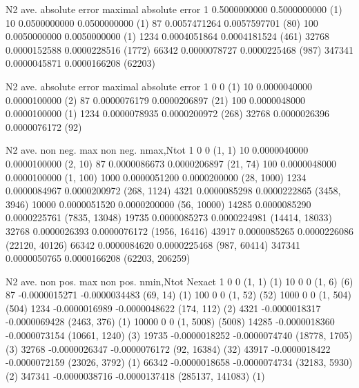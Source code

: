 \bye


N2      ave. absolute error maximal absolute error
1       0.5000000000        0.5000000000 (1)
10      0.0500000000        0.0500000000 (1)
87      0.0057471264        0.0057597701 (80)
100     0.0050000000        0.0050000000 (1)
1234    0.0004051864        0.0004181524 (461)
32768   0.0000152588        0.0000228516 (1772)
66342   0.0000078727        0.0000225468 (987)
347341  0.0000045871        0.0000166208 (62203)


N2      ave. absolute error maximal absolute error
1       0                   0            (1)
10      0.0000040000        0.0000100000 (2)
87      0.0000076179        0.0000206897 (21)
100     0.0000048000        0.0000100000 (1)
1234    0.0000078935        0.0000200972 (268)
32768   0.0000026396        0.0000076172 (92)           


N2     ave. non neg.   max non neg. nmax,Ntot      
1      0               0            (1, 1)          
10     0.0000040000    0.0000100000 (2, 10)         
87     0.0000086673    0.0000206897 (21, 74)        
100    0.0000048000    0.0000100000 (1, 100)        
1000   0.0000051200    0.0000200000 (28, 1000)      
1234   0.0000084967    0.0000200972 (268, 1124)     
4321   0.0000085298    0.0000222865 (3458, 3946)    
10000  0.0000051520    0.0000200000 (56, 10000)     
14285  0.0000085290    0.0000225761 (7835, 13048)   
19735  0.0000085273    0.0000224981 (14414, 18033)
32768  0.0000026393    0.0000076172 (1956, 16416)   
43917  0.0000085265    0.0000226086 (22120, 40126)  
66342  0.0000084620    0.0000225468 (987, 60414)    
347341 0.0000050765    0.0000166208 (62203, 206259)  

N2      ave. non pos.  max non pos.  nmin,Ntot    Nexact    
1       0              0            (1, 1)           (1)   
10      0              0            (1, 6)           (6)   
87     -0.0000015271  -0.0000034483 (69, 14)         (1)   
100     0              0            (1, 52)          (52)  
1000    0              0            (1, 504)         (504) 
1234   -0.0000016989  -0.0000048622 (174, 112)       (2)   
4321   -0.0000018317  -0.0000069428 (2463, 376)      (1)   
10000   0              0            (1, 5008)        (5008)
14285  -0.0000018360  -0.0000073154 (10661, 1240)    (3)   
19735  -0.0000018252  -0.0000074740 (18778, 1705)    (3)
32768  -0.0000026347  -0.0000076172 (92, 16384)      (32)  
43917  -0.0000018422  -0.0000072159 (23026, 3792)    (1)   
66342  -0.0000018658  -0.0000074734 (32183, 5930)    (2)   
347341 -0.0000038716  -0.0000137418 (285137, 141083) (1)   